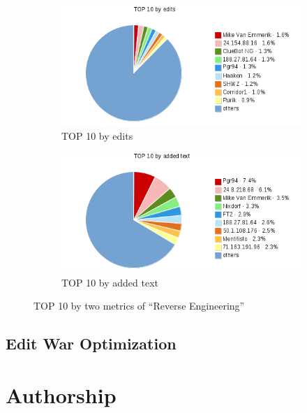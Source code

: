\documentclass[preprint,review,12pt]{elsarticle}
\begin{document}
\begin{figure}[h]
  \centering

    \begin{subfigure}{0.5\textwidth}
    \centering \includegraphics[width=0.9\linewidth]{pic/wiki1.png}
    \caption{TOP 10 by edits}
    \label{fig:wiki1}
    \end{subfigure}

    \begin{subfigure}{0.5\textwidth}
    \centering \includegraphics[width=0.9\linewidth]{pic/wiki2.png}
    \caption{TOP 10 by added text}%
    \label{fig:wiki1}
    \end{subfigure}

  \caption{TOP 10 by two metrics of ``Reverse Engineering''}
\end{figure}


\subsection{Edit War Optimization}

\section{Authorship}
\end{document}
